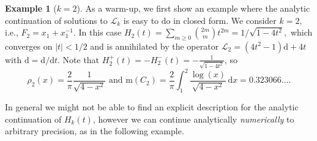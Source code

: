 \documentclass[12pt,reqno]{amsart}
\theoremstyle{definition}
\theoremstyle{plain}
\theoremstyle{definition}
\newtheorem{example}[theorem]{Example}
\newcommand\m{\mathrm{m}}
\renewcommand{\geq}{\geqslant}
\renewcommand{\d}{\mathrm{d}}
\begin{document}
\begin{example}[$k=2$]
\label{excompk2} As a warm-up, we first show an example where the analytic continuation of solutions to $\mathcal L_k$ is easy to do in closed form. We consider $k=2$, i.e., $F_2 =  x_1 + x_1^{-1}$. In this case 
$
    H_2(t) =  \sum_{m \geq 0} \binom{2m}{m} t^{2m} = 1/\sqrt{1-4t^2}, 
 $
which converges on $|t|<1/2$ and is annihilated by the operator $\mathcal L_2 = (4t^2-1)\d+4t$ with $\d = {\d}/{\d t}$.
Note that $H_2^{+}(t) = - H_2^-(t) = -\frac{1}{\sqrt{1-4t^2}}$, so 
\[
\rho_2(x) = \frac{2}{\pi} \frac{1}{\sqrt{4-x^2}}
\mbox{ 
and 
} 
\m(C_2) = \frac{2}{\pi}\int_{1}^2  \frac{\log(x)}{\sqrt{4-x^2}} \, \d x= 0.323066 \ldots.
\]
\end{example}


In general we might not be able to find an explicit description for the analytic continuation of $H_k(t)$, however we can continue analytically \emph{numerically} to arbitrary precision, as in the following example. 
\end{document}
